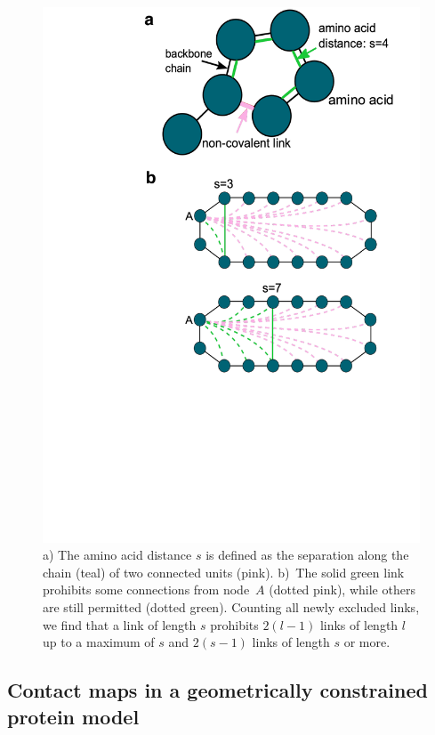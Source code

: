 \documentclass[
reprint,
twocolumn,
amsmath,amssymb,superscriptaddress,aps,
pre]{revtex4-1}
\begin{document}
\begin{figure}[h!]
    \centering
    \includegraphics[width=0.8\columnwidth]{figures/Fig1/Fig1.pdf}
    \caption{a) The amino acid distance $s$ is defined as the separation along the chain (teal) of two connected units (pink). b)~The solid green link prohibits some connections from node~$A$ (dotted pink), while others are still permitted (dotted green). Counting all newly excluded links, we find that a link of length $s$ prohibits $2(l-1)$ links of length $l$ up to a maximum of $s$ and $2(s-1)$ links of length $s$ or more.}
    \label{fig:schematic}
\end{figure}

\subsection{Contact maps in a geometrically constrained protein model}
\end{document}
